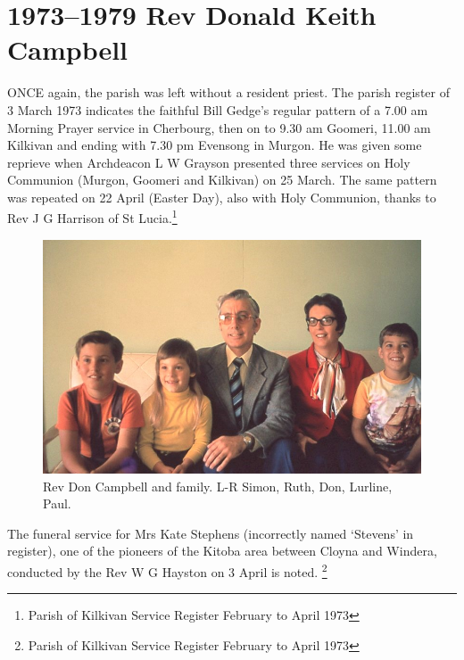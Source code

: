 \balance


\printendnotes[custom]
\setcounter{endnote}{0}
\chapter{1973--1979 Rev Donald Keith Campbell}
\nobalance


\lettrine[lines=3]{O}{NCE}
 again, the parish was left without a resident priest. The parish register of 3 March 1973 indicates the faithful Bill Gedge's regular pattern of a 7.00 am Morning Prayer service in Cherbourg, then on to 9.30 am Goomeri, 11.00 am Kilkivan and ending with 7.30 pm Evensong in Murgon. He was given some reprieve when Archdeacon L W Grayson presented three services on Holy Communion (Murgon, Goomeri and Kilkivan) on 25 March. The same pattern was repeated on 22 April (Easter Day), also with Holy Communion, thanks to Rev J G Harrison of St Lucia.\footnote{Parish of Kilkivan Service Register February to April 1973}







\begin{figure}
\begin{center}
\includegraphics[width=1.\linewidth,center]{../images/DonCampbellAndFamily.png}
\caption{Rev Don Campbell and family. L-R Simon, Ruth, Don, Lurline, Paul.}
\end{center}
\end{figure}




The funeral service for Mrs Kate Stephens (incorrectly named `Stevens' in register), one of the pioneers of the Kitoba area between Cloyna and Windera, conducted by the Rev W G Hayston on 3 April is noted. \footnote{Parish of Kilkivan Service Register February to April 1973}


